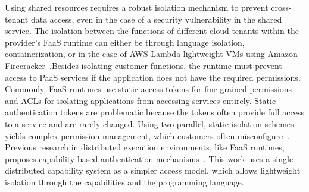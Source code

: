 Using shared resources requires a robust isolation mechanism to prevent cross-tenant data access, even in the case of a security vulnerability in the shared service. The isolation between the functions of different cloud tenants within the provider's \ac{FaaS} runtime can either be through language isolation, containerization, or in the case of \ac{AWS} Lambda lightweight \acp{VM} using Amazon Firecracker~\cite{agacheFirecrackerLightweightVirtualization2020}.\@ Besides isolating customer functions, the runtime must prevent access to \ac{PaaS} services if the application does not have the required permissions. Commonly, \ac{FaaS} runtimes use static access tokens for fine-grained permissions and \acp{ACL} for isolating applications from accessing services entirely. Static authentication tokens are problematic because the tokens often provide full access to a service and are rarely changed.
Using two parallel, static isolation schemes yields complex permission management, which customers often misconfigure~\cite{huangConfValleySystematicConfiguration2015}.\@
Previous research in distributed execution environments, like \ac{FaaS} runtimes, proposes capability-based authentication mechanisms~\cite{tanenbaumDistributedOperatingSystems1985, vilanovaSlashingDisaggregationTax2022}.\@
This work uses a single distributed capability system as a simpler access model, which allows lightweight isolation through the capabilities and the programming language.

